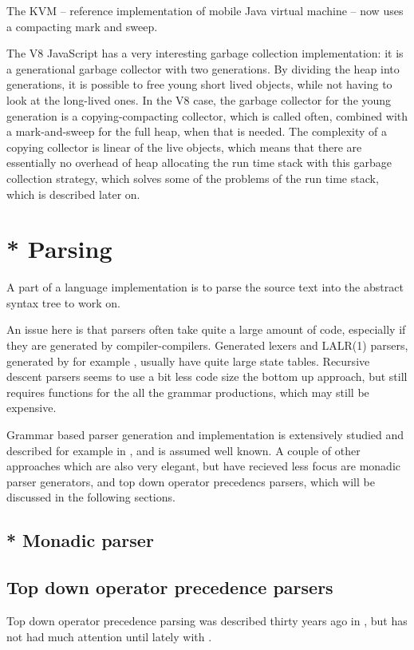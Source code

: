 The KVM -- reference implementation of mobile Java virtual machine -- now uses a compacting mark and sweep.

The V8 JavaScript has a very interesting garbage collection implementation: it is a generational garbage collector with two generations.
By dividing the heap into generations, it is possible to free young short lived objects, while not having to look at the long-lived ones. 
In the V8 case, the garbage collector for the young generation is a copying-compacting collector, which is called often, combined with a mark-and-sweep for the full heap, when that is needed.
The complexity of a copying collector is linear of the live objects, which means that there are essentially no overhead of heap allocating the run time stack with this garbage collection strategy, which solves some of the problems of the run time stack, which is described later on.

\section{* Parsing}
A part of a language implementation is to parse the source text into the abstract syntax tree to work on. 

An issue here is that parsers often take quite a large amount of code, especially if they are generated by compiler-compilers.
Generated lexers and LALR(1) parsers, generated by for example \cite{yacc, yacc2}, usually have quite large state tables.
Recursive descent parsers seems to use a bit less code size the bottom up approach, but still requires functions for the all the grammar productions, which may still be expensive.

Grammar based parser generation and implementation is extensively studied and described for example in \cite{basics-of-compiler-design, grammar}, and is assumed well known.
A couple of other approaches which are also very elegant, 
but have recieved less focus are
monadic parser generators, and top down operator precedencs parsers,
which will be discussed in the following sections.

\subsection{* Monadic parser}

\subsection{Top down operator precedence parsers}
\label{tdop}
Top down operator precedence parsing was described thirty years ago in \cite{top-down-operator-precedence}, but has not had much attention until lately with \cite{beautiful-code}.

